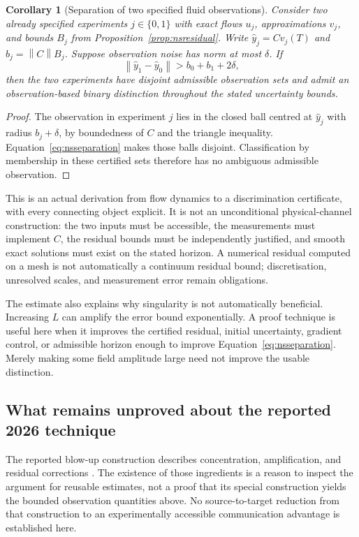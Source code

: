 \documentclass[11pt,a4paper]{article}
\newtheorem{corollary}[theorem]{Corollary}
\theoremstyle{definition}
\theoremstyle{remark}
\newcommand{\norm}[1]{\left\lVert#1\right\rVert}
\begin{document}
\begin{corollary}[Separation of two specified fluid observations]\label{cor:nsobservation}
Consider two already specified experiments $j\in\{0,1\}$ with exact flows $u_j$, approximations $v_j$, and bounds $B_j$ from Proposition~\ref{prop:nsresidual}. Write $\hat y_j=Cv_j(T)$ and $b_j=\norm{C}B_j$. Suppose observation noise has norm at most $\delta$. If
\begin{equation}\label{eq:nsseparation}
 \norm{\hat y_1-\hat y_0}>b_0+b_1+2\delta,
\end{equation}
then the two experiments have disjoint admissible observation sets and admit an observation-based binary distinction throughout the stated uncertainty bounds.
\end{corollary}
\begin{proof}
The observation in experiment $j$ lies in the closed ball centred at $\hat y_j$ with radius $b_j+\delta$, by boundedness of $C$ and the triangle inequality. Equation~\eqref{eq:nsseparation} makes those balls disjoint. Classification by membership in these certified sets therefore has no ambiguous admissible observation.
\end{proof}

This is an actual derivation from flow dynamics to a discrimination certificate, with every connecting object explicit. It is not an unconditional physical-channel construction: the two inputs must be accessible, the measurements must implement $C$, the residual bounds must be independently justified, and smooth exact solutions must exist on the stated horizon. A numerical residual computed on a mesh is not automatically a continuum residual bound; discretisation, unresolved scales, and measurement error remain obligations.

The estimate also explains why singularity is not automatically beneficial. Increasing $L$ can amplify the error bound exponentially. A proof technique is useful here when it improves the certified residual, initial uncertainty, gradient control, or admissible horizon enough to improve Equation~\eqref{eq:nsseparation}. Merely making some field amplitude large need not improve the usable distinction.

\subsection{What remains unproved about the reported 2026 technique}
The reported blow-up construction describes concentration, amplification, and residual corrections \citep{openains}. The existence of those ingredients is a reason to inspect the argument for reusable estimates, not a proof that its special construction yields the bounded observation quantities above. No source-to-target reduction from that construction to an experimentally accessible communication advantage is established here.
\end{document}
